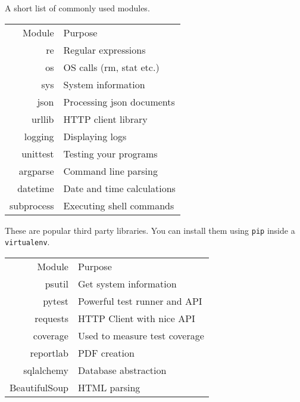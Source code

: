 A short list of commonly used modules.
\begin{center}
\begin{tabular}[t]{| r | l |}
\hline
\cellcolor[gray]{0.9} Module & \cellcolor[gray]{0.9} Purpose \\
  re & Regular expressions \\
  os & OS calls (rm, stat etc.)\\
  sys & System information  \\
  json & Processing json documents \\
  urllib & HTTP client library \\
  logging & Displaying logs \\
  unittest & Testing your programs \\
  argparse & Command line parsing \\
  datetime & Date and time calculations \\
  subprocess & Executing shell commands \\
\hline
\end{tabular}
\end{center}

These are popular third party libraries. You can install them
using \texttt{pip} inside a \texttt{virtualenv}.
\begin{center}
\begin{tabular}[t]{| r | l |}
\hline
\cellcolor[gray]{0.9} Module & \cellcolor[gray]{0.9} Purpose \\
  psutil & Get system information \\
  pytest & Powerful test runner and API \\
  requests & HTTP Client with nice API \\
  coverage & Used to measure test coverage \\
  reportlab & PDF creation \\
  sqlalchemy & Database abstraction \\
  BeautifulSoup & HTML parsing \\
\hline
\end{tabular}
\end{center}
